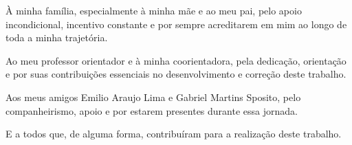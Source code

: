 %
%

\begin{dedicatoria}

À minha família, especialmente à minha mãe e ao meu pai, pelo apoio incondicional, incentivo constante e por sempre acreditarem em mim ao longo de toda a minha trajetória.

Ao meu professor orientador e à minha coorientadora, pela dedicação, orientação e por suas contribuições essenciais no desenvolvimento e correção deste trabalho.

Aos meus amigos Emilio Araujo Lima e Gabriel Martins Sposito, pelo companheirismo, apoio e por estarem presentes durante essa jornada.

E a todos que, de alguma forma, contribuíram para a realização deste trabalho.

\end{dedicatoria}